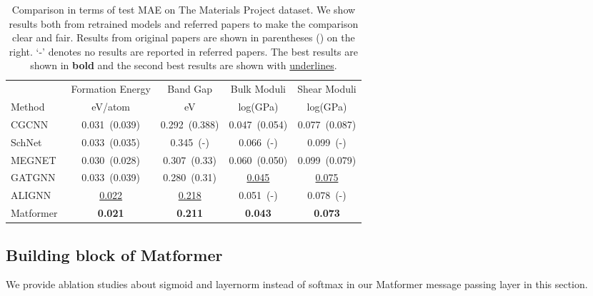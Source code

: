 \documentclass{article}
\begin{document}
\begin{table}[t]
  \vspace{-4mm}
  \caption{Comparison 
in terms of test MAE on The Materials Project dataset. We show results both from retrained models and referred papers to make the comparison clear and fair. 
Results from original papers are shown in parentheses () on the right. ‘-’ denotes no results are reported in referred papers. The best results are shown in \textbf{bold} and the second best results are shown with \uline{underlines}.}
  \label{mp-table-app}
  \centering
  \begin{tabular}{lcccc}
    \toprule
    & Formation Energy & Band Gap & Bulk Moduli & Shear Moduli \\
    \cmidrule(r){2-5}
    Method & eV/atom  &  eV &   log(GPa) & log(GPa)  \\
    \midrule
    CGCNN~\citep{cgcnn} & 0.031~(0.039) & 0.292~(0.388)  & 0.047~(0.054) &0.077~(0.087) \\
    SchNet~\citep{schnet} & 0.033~(0.035) & 0.345~(-) & 0.066~(-) & 0.099~(-) \\
    MEGNET~\citep{megnet} & 0.030~(0.028) & 0.307~(0.33) & 0.060~(0.050) & 0.099~(0.079) \\
    GATGNN~\citep{gatgnn} & 0.033~(0.039) & 0.280~(0.31) & \uline{0.045} & \uline{0.075} \\
    ALIGNN~\citep{alignn} & \uline{0.022} & \uline{0.218} & 0.051~(-) & 0.078~(-) \\
    Matformer & \textbf{0.021} & \textbf{0.211} & \textbf{0.043} & \textbf{0.073} \\
    \bottomrule
  \end{tabular}
  \vspace{-4mm}
\end{table}


\subsection{Building block of Matformer}
\label{app:building}
We provide ablation studies about sigmoid and layernorm instead of softmax in our Matformer message passing layer in this section.
\end{document}
